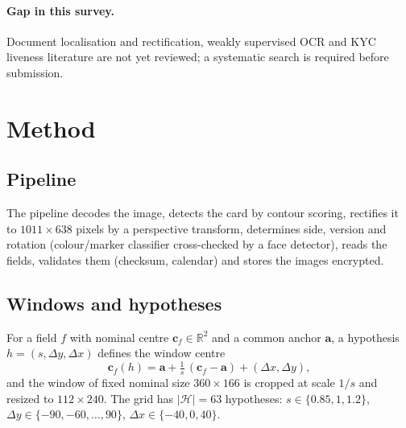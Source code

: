 \documentclass[11pt,a4paper]{article}
\begin{document}
\paragraph{Gap in this survey.} Document localisation and rectification, weakly supervised OCR and KYC liveness literature are not yet reviewed; a systematic search is required before submission.

\section{Method}
\subsection{Pipeline}
The pipeline decodes the image, detects the card by contour scoring, rectifies it to $1011\times 638$ pixels by a perspective transform, determines side, version and rotation (colour/marker classifier cross-checked by a face detector), reads the fields, validates them (checksum, calendar) and stores the images encrypted.

\subsection{Windows and hypotheses}
For a field $f$ with nominal centre $\mathbf{c}_f\in\mathbb{R}^2$ and a common anchor $\mathbf{a}$, a hypothesis $h=(s,\Delta y,\Delta x)$ defines the window centre
\begin{equation}
\mathbf{c}_f(h)=\mathbf{a}+\tfrac{1}{s}\,(\mathbf{c}_f-\mathbf{a})+(\Delta x,\Delta y),
\label{eq:centre}
\end{equation}
and the window of fixed nominal size $360\times166$ is cropped at scale $1/s$ and resized to $112\times240$. The grid has $|\mathcal{H}|=63$ hypotheses: $s\in\{0.85,1,1.2\}$, $\Delta y\in\{-90,-60,\dots,90\}$, $\Delta x\in\{-40,0,40\}$.
\end{document}
